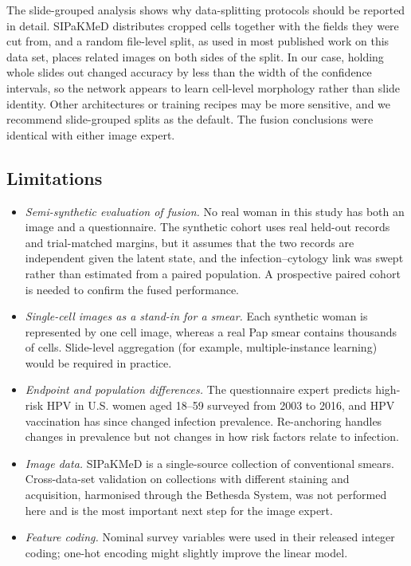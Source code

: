 \documentclass[lettersize,journal]{IEEEtran}
\begin{document}
The slide-grouped analysis shows why data-splitting protocols should be reported in detail. SIPaKMeD distributes cropped cells together with the fields they were cut from, and a random file-level split, as used in most published work on this data set, places related images on both sides of the split. In our case, holding whole slides out changed accuracy by less than the width of the confidence intervals, so the network appears to learn cell-level morphology rather than slide identity. Other architectures or training recipes may be more sensitive, and we recommend slide-grouped splits as the default. The fusion conclusions were identical with either image expert.

\subsection{Limitations}
\begin{itemize}
\item \emph{Semi-synthetic evaluation of fusion.} No real woman in this study has both an image and a questionnaire. The synthetic cohort uses real held-out records and trial-matched margins, but it assumes that the two records are independent given the latent state, and the infection--cytology link was swept rather than estimated from a paired population. A prospective paired cohort is needed to confirm the fused performance.
\item \emph{Single-cell images as a stand-in for a smear.} Each synthetic woman is represented by one cell image, whereas a real Pap smear contains thousands of cells. Slide-level aggregation (for example, multiple-instance learning) would be required in practice.
\item \emph{Endpoint and population differences.} The questionnaire expert predicts high-risk HPV in U.S. women aged 18--59 surveyed from 2003 to 2016, and HPV vaccination has since changed infection prevalence. Re-anchoring handles changes in prevalence but not changes in how risk factors relate to infection.
\item \emph{Image data.} SIPaKMeD is a single-source collection of conventional smears. Cross-data-set validation on collections with different staining and acquisition, harmonised through the Bethesda System, was not performed here and is the most important next step for the image expert.
\item \emph{Feature coding.} Nominal survey variables were used in their released integer coding; one-hot encoding might slightly improve the linear model.
\end{itemize}
\end{document}
